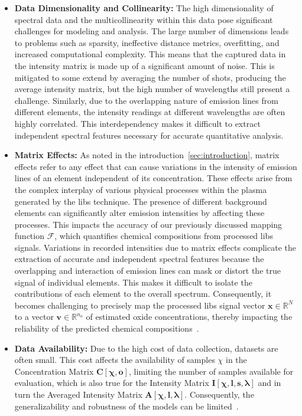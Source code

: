 \begin{itemize}
    \item \textbf{Data Dimensionality and Collinearity:} The high dimensionality of spectral data and the multicollinearity within this data pose significant challenges for modeling and analysis.
The large number of dimensions leads to problems such as sparsity, ineffective distance metrics, overfitting, and increased computational complexity. 
This means that the captured data in the intensity matrix is made up of a significant amount of noise. This is mitigated to some extend by averaging the number of shots, producing the average intensity matrix, but the high number of wavelengths still present a challenge.
Similarly, due to the overlapping nature of emission lines from different elements, the intensity readings at different wavelengths are often highly correlated. 
This interdependency makes it difficult to extract independent spectral features necessary for accurate quantitative analysis\cite{andersonImprovedAccuracyQuantitative2017}.

    \item \textbf{Matrix Effects:} As noted in the introduction~\ref{sec:introduction}, matrix effects refer to any effect that can cause variations in the intensity of emission lines of an element independent of its concentration. These effects arise from the complex interplay of various physical processes within the plasma generated by the \gls{libs} technique. The presence of different background elements can significantly alter emission intensities by affecting these processes. This impacts the accuracy of our previously discussed mapping function $\mathcal{F}$, which quantifies chemical compositions from processed \gls{libs} signals. Variations in recorded intensities due to matrix effects complicate the extraction of accurate and independent spectral features because the overlapping and interaction of emission lines can mask or distort the true signal of individual elements. This makes it difficult to isolate the contributions of each element to the overall spectrum. Consequently, it becomes challenging to precisely map the processed \gls{libs} signal vector $\mathbf{x} \in \mathbb{R}^N$ to a vector $\mathbf{v} \in \mathbb{R}^{n_o}$ of estimated oxide concentrations, thereby impacting the reliability of the predicted chemical compositions~\cite{cleggRecalibrationMarsScience2017, andersonImprovedAccuracyQuantitative2017}.
    
    \item \textbf{Data Availability:} Due to the high cost of data collection, datasets are often small. 
    This cost affects the availability of samples $\chi$ in the Concentration Matrix $\mathbf{C[\chi, o]}$, limiting the number of samples available for evaluation, which is also true for the Intensity Matrix $\mathbf{I[\chi, l, s, \lambda]}$ and in turn the Averaged Intensity Matrix $\mathbf{A[\chi, l, \lambda]}$. 
    Consequently, the generalizability and robustness of the models can be limited~\cite{p9_paper}.
\end{itemize}

